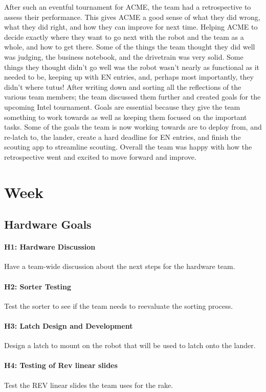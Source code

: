 \documentclass{article}
\begin{document}
After such an eventful tournament for ACME, the team had a retrospective to assess their performance. This gives ACME a good sense of what they did wrong, what they did right, and how they can improve for next time. Helping ACME to decide exactly where they want to go next with the robot and the team as a whole, and how to get there. Some of the things the team thought they did well was judging, the business notebook, and the drivetrain was very solid. Some things they thought didn’t go well was the robot wasn’t nearly as functional as it needed to be, keeping up with EN entries, and, perhaps most importantly, they didn’t where tutus! After writing down and sorting all the reflections of the various team members; the team discussed them further and created goals for the upcoming Intel tournament. Goals are essential because they give the team something to work towards as well as keeping them focused on the important tasks. Some of the goals the team is now working towards are to deploy from, and re-latch to, the lander, create a hard deadline for EN entries, and finish the scouting app to streamline scouting. Overall the team was happy with how the retrospective went and excited to move forward and improve. 
\clearpage \newpage \section{Week \thesection} 
\subsection{Hardware Goals}
\paragraph{H1: Hardware Discussion}
 Have a team-wide discussion about the next steps for the hardware team.
\paragraph{H2: Sorter Testing}
Test the sorter to see if the team needs to reevaluate the sorting process.
\paragraph{H3: Latch Design and Development}
 Design a latch to mount on the robot that will be used to latch onto the lander.
\paragraph{H4: Testing of Rev linear slides}
 Test the REV linear slides the team uses for the rake.
\end{document}
